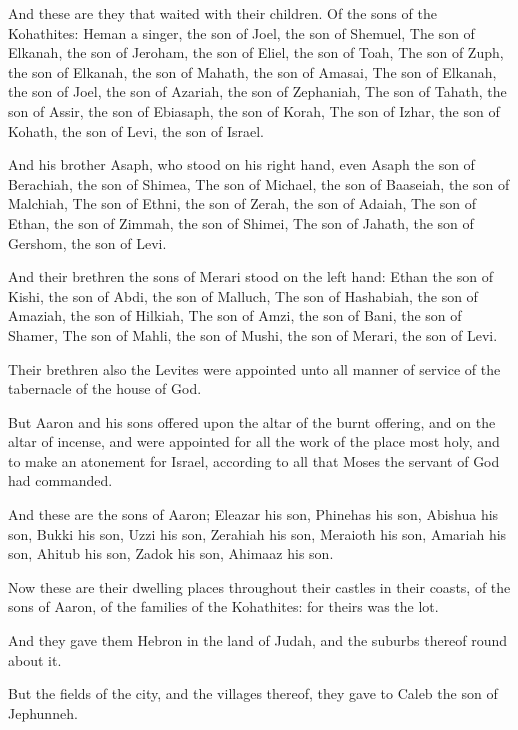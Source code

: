 \Verse And these are they that waited with their children. Of the sons of the Kohathites: Heman a singer, the son of Joel, the son of Shemuel, \Verse The son of Elkanah, the son of Jeroham, the son of Eliel, the son of Toah, \Verse The son of Zuph, the son of Elkanah, the son of Mahath, the son of Amasai, \Verse The son of Elkanah, the son of Joel, the son of Azariah, the son of Zephaniah, \Verse The son of Tahath, the son of Assir, the son of Ebiasaph, the son of Korah, \Verse The son of Izhar, the son of Kohath, the son of Levi, the son of Israel.

\Verse And his brother Asaph, who stood on his right hand, even Asaph the son of Berachiah, the son of Shimea, \Verse The son of Michael, the son of Baaseiah, the son of Malchiah, \Verse The son of Ethni, the son of Zerah, the son of Adaiah, \Verse The son of Ethan, the son of Zimmah, the son of Shimei, \Verse The son of Jahath, the son of Gershom, the son of Levi.

\Verse And their brethren the sons of Merari stood on the left hand: Ethan the son of Kishi, the son of Abdi, the son of Malluch, \Verse The son of Hashabiah, the son of Amaziah, the son of Hilkiah, \Verse The son of Amzi, the son of Bani, the son of Shamer, \Verse The son of Mahli, the son of Mushi, the son of Merari, the son of Levi.

\Verse Their brethren also the Levites were appointed unto all manner of service of the tabernacle of the house of God.

\Verse But Aaron and his sons offered upon the altar of the burnt offering, and on the altar of incense, and were appointed for all the work of the place most holy, and to make an atonement for Israel, according to all that Moses the servant of God had commanded.

\Verse And these are the sons of Aaron; Eleazar his son, Phinehas his son, Abishua his son, \Verse Bukki his son, Uzzi his son, Zerahiah his son, \Verse Meraioth his son, Amariah his son, Ahitub his son, \Verse Zadok his son, Ahimaaz his son.

\Verse Now these are their dwelling places throughout their castles in their coasts, of the sons of Aaron, of the families of the Kohathites: for theirs was the lot.

\Verse And they gave them Hebron in the land of Judah, and the suburbs thereof round about it.

\Verse But the fields of the city, and the villages thereof, they gave to Caleb the son of Jephunneh.

